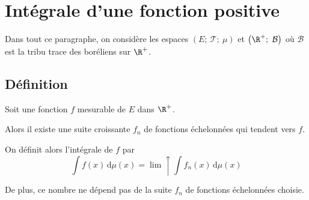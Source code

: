 \section{Intégrale d'une fonction positive}

Dans tout ce paragraphe, on considère les espaces $\left(E;~ \mathcal{T};~\mu\right)$ et $\left(\R^{+};~ \mathcal{B}\right)$ où $\mathcal{B}$ est la tribu trace des boréliens sur $\R^{+}$.

\subsection{Définition}

\begin{theo}
Soit une fonction $f$ mesurable de $E$ dans $\R^{+}$.

Alors il existe une suite croissante $f_n$ de fonctions échelonnées qui tendent vers $f$.

On définit alors l'intégrale de $f$ par 
\[
\displaystyle{\int f(x)  \, \mathrm d \mu(x)} = \lim \uparrow \displaystyle{\int f_n(x)  \,  \mathrm d \mu(x)}
\]

De plus, ce nombre ne dépend pas de la suite $f_n$ de fonctions échelonnées choisie.
\end{theo}

